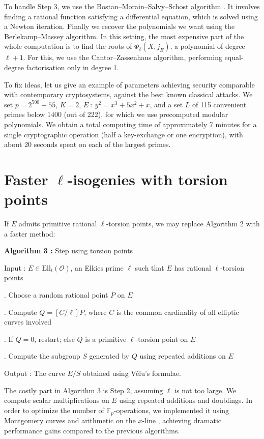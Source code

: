 \documentclass[12pt]{article}
\newcommand{\F}{\mathbb{F}}
\renewcommand{\O}{\mathcal{O}}
\newcommand{\Ell}{\mathrm{Ell}}
\begin{document}
To handle Step 3, we use the Bostan--Morain--Salvy--Schost algorithm \cite{BMSS}. It involves finding a rational function satisfying a differential equation, which is solved using a Newton iteration. Finally we recover the polynomials we want using the Berlekamp--Massey algorithm. In this setting, the most expensive part of the whole computation is to find the roots of $\Phi_\ell(X, j_E)$, a polynomial of degree $\ell + 1$. For this, we use the Cantor--Zassenhaus algorithm, performing equal-degree factorisation only in degree 1.

To fix ideas, let us give an example of parameters achieving security comparable with contemporary cryptosystems, against the best known classical attacks. We set $p = 2^{500} + 55$, $K = 2$, $E\ :\ y^2 = x^3 + 5x^2 + x$, and a set $L$ of 115 convenient primes below $1400$ (out of 222), for which we use precomputed modular polynomials. We obtain a total computing time of approximately 7 minutes for a single cryptographic operation (half a key-exchange or one encryption), with about 20 seconds spent on each of the largest primes.

\section{Faster $\ell$-isogenies with torsion points}

If $E$ admits primitive rational $\ell$-torsion points, we may replace Algorithm 2 with a faster method:

\vspace{2mm}
\textbf{Algorithm 3 :} Step using torsion points

\noindent
Input : $E\in \Ell_t(\O)$, an Elkies prime $\ell$ such that $E$ has rational $\ell$-torsion points

. Choose a random rational point $P$ on $E$

. Compute $Q = [C/\ell]P$, where $C$ is the common cardinality of all elliptic curves involved

. If $Q = 0$, restart; else $Q$ is a primitive $\ell$-torsion point on $E$

. Compute the subgroup $S$ generated by $Q$ using repeated additions on $E$

\noindent
Output : The curve $E/S$ obtained using V\'elu's formulae. %
\vspace{2mm}

The costly part in Algorithm 3 is Step 2, assuming $\ell$ is not too large. We compute scalar multiplications on $E$ using repeated additions and doublings. In order to optimize the number of $\F_p$-operations, we implemented it using Montgomery curves and arithmetic on the $x$-line \cite{Montgomery}, achieving dramatic performance gains compared to the previous algorithms.
\end{document}
